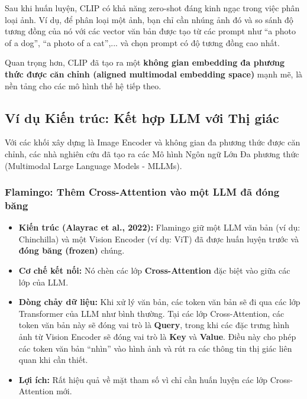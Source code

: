 Sau khi huấn luyện, CLIP có khả năng zero-shot đáng kinh ngạc trong việc phân loại ảnh. Ví dụ, để phân loại một ảnh, bạn chỉ cần nhúng ảnh đó và so sánh độ tương đồng của nó với các vector văn bản được tạo từ các prompt như “a photo of a dog”, “a photo of a cat”,... và chọn prompt có độ tương đồng cao nhất.

Quan trọng hơn, CLIP đã tạo ra một \textbf{không gian embedding đa phương thức được căn chỉnh (aligned multimodal embedding space)} mạnh mẽ, là nền tảng cho các mô hình thế hệ tiếp theo.

\subsection{Ví dụ Kiến trúc: Kết hợp LLM với Thị giác}
\label{ssec:multimodal_architectures_examples}
Với các khối xây dựng là Image Encoder và không gian đa phương thức được căn chỉnh, các nhà nghiên cứu đã tạo ra các Mô hình Ngôn ngữ Lớn Đa phương thức (Multimodal Large Language Models - MLLMs).

\subsubsection{Flamingo: Thêm Cross-Attention vào một LLM đã đóng băng}
\begin{itemize}
    \item \textbf{Kiến trúc (Alayrac et al., 2022):} Flamingo giữ một LLM văn bản (ví dụ: Chinchilla) và một Vision Encoder (ví dụ: ViT) đã được huấn luyện trước và \textbf{đóng băng (frozen)} chúng.
    \item \textbf{Cơ chế kết nối:} Nó chèn các lớp \textbf{Cross-Attention} đặc biệt vào giữa các lớp của LLM.
    \item \textbf{Dòng chảy dữ liệu:} Khi xử lý văn bản, các token văn bản sẽ đi qua các lớp Transformer của LLM như bình thường. Tại các lớp Cross-Attention, các token văn bản này sẽ đóng vai trò là \textbf{Query}, trong khi các đặc trưng hình ảnh từ Vision Encoder sẽ đóng vai trò là \textbf{Key} và \textbf{Value}. Điều này cho phép các token văn bản “nhìn” vào hình ảnh và rút ra các thông tin thị giác liên quan khi cần thiết.
    \item \textbf{Lợi ích:} Rất hiệu quả về mặt tham số vì chỉ cần huấn luyện các lớp Cross-Attention mới.
\end{itemize}


